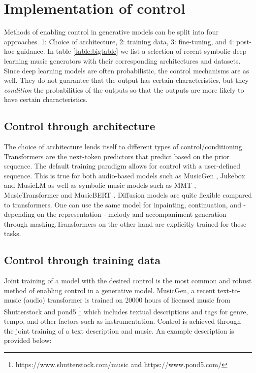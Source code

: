 \section{Implementation of control} \label{section:addingcontrol}
Methods of enabling control in generative models can be split into four approaches. 1: Choice of architecture, 2: training data, 3: fine-tuning, and 4: post-hoc guidance. In table \ref{table:bigtable} we list a selection of recent symbolic deep-learning music generators with their corresponding architectures and datasets. Since deep learning models are often probabilistic, the control mechanisms are as well. They do not guarantee that the output has certain characteristics, but they \textit{condition} the probabilities of the outputs so that the outputs are more likely to have certain characteristics. 

\subsection{Control through architecture}
The choice of architecture lends itself to different types of control/conditioning. Transformers are the next-token predictors that predict based on the prior sequence. The default training paradigm allows for control with a user-defined sequence. This is true for both audio-based models such as MusicGen \cite{copet2023simple}, Jukebox \cite{Dhariwal_Jun_Payne_Kim_Radford_Sutskever_2020} and MusicLM \cite{Agostinelli_Denk_Borsos_Engel_Verzetti_Caillon_Huang_Jansen_Roberts_Tagliasacchi_et_al._2023} as well as symbolic music models such as MMT \cite{Dong_Chen_MMT_Kirkpatrick_2023}, MusicTransformer \cite{Huang_Vaswani_Uszkoreit_Shazeer_Simon_Hawthorne_Dai_Hoffman_Dinculescu_Eck_2018} and MusicBERT \cite{Zeng_Tan_Wang_MUSICBERT_2021}. Diffusion models are quite flexible compared to transformers. One can use the same model for inpainting, continuation, and - depending on the representation - melody and accompaniment generation through masking.\cite{Min_Jiang_Xia_Zhao_polyffusion_2023}\cite{Rombach_Blattmann_Lorenz_Esser_Ommer_2022}Transformers on the other hand are explicitly trained for these tasks. 

\subsection{Control through training data}
Joint training of a model with the desired control is the most common and robust method of enabling control in a generative model. MusicGen\cite{copet2023simple}, a recent text-to-music (audio) transformer is trained on 20000 hours of licensed music from Shutterstock and pond5 \footnote{https://www.shutterstock.com/music and https://www.pond5.com/} which includes textual descriptions and tags for genre, tempo, and other factors such as instrumentation. Control is achieved through the joint training of a text description and music. An example description is provided below: 

